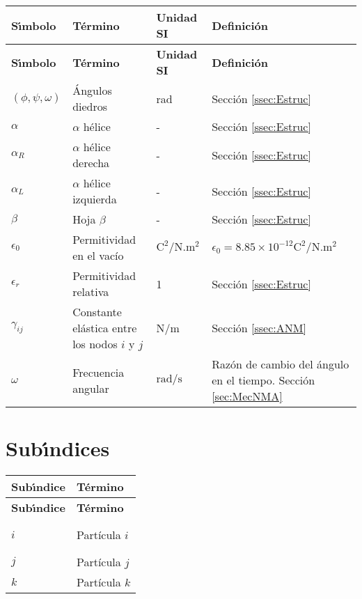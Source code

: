 \begin{longtable}{p{2cm}p{3.5cm}p{2cm}p{8cm}}
\textbf{S\'{\i}mbolo}&\textbf{T\'{e}rmino}&\textbf{Unidad SI}&\textbf{Definici\'{o}n}\\[0.5ex] \hline%
\endfirsthead%
\textbf{S\'{\i}mbolo}&\textbf{T\'{e}rmino}&\textbf{Unidad SI}&\textbf{Definici\'{o}n}\\[0.5ex] \hline%
\endhead%
\renewcommand{\arraystretch}{1.3}
 \label{simbolosg}
 $(\phi,\psi,\omega)$&\'{A}ngulos diedros&rad &Secci\'{o}n \ref{ssec:Estruc} \\
 $\alpha$ &$\alpha$ h\'{e}lice&- &Secci\'{o}n \ref{ssec:Estruc}\\
     $\alpha_R$&$\alpha$ h\'{e}lice derecha&- &Secci\'{o}n \ref{ssec:Estruc}\\
     $\alpha_L$&$\alpha$ h\'{e}lice izquierda&- &Secci\'{o}n \ref{ssec:Estruc} \\
  $\beta$&Hoja $\beta$&- &Secci\'{o}n \ref{ssec:Estruc} \\
  $\epsilon_0$&Permitividad en el vac\'{i}o&$\mathrm{C^2/N.m^2}$&$\epsilon_0=8.85\times 10^{-12}\mathrm{C^2/N.m^2}$ \\ 
   $\epsilon_r$&Permitividad relativa&1&Secci\'{o}n \ref{ssec:Estruc} \\
   $\gamma_{ij}$&Constante el\'{a}stica entre los nodos $i$ y $j$&N/m&Secci\'{o}n \ref{ssec:ANM} \\
   $\omega$&Frecuencia angular&$\mathrm{rad/s}$&Raz\'{o}n de cambio del \'{a}ngulo en el tiempo. Secci\'{o}n \ref{sec:MecNMA}\\%
     \hline
\end{longtable}


\section*{Sub\'{\i}ndices}
\begin{longtable}{ll}
  \textbf{Sub\'{\i}ndice} & \textbf{T\'{e}rmino} \\[0.5ex] \hline%
  \endfirsthead%
  \textbf{Sub\'{\i}ndice} & \textbf{T\'{e}rmino} \\[0.5ex] \hline%
  \endhead%
\renewcommand{\arraystretch}{1.4}\label{simbolosg}

 $i$&Part\'{i}cula $i$\\%
 $j$&Part\'{i}cula $j$\\%
 $k$&Part\'{i}cula $k$\\%


\end{longtable}


